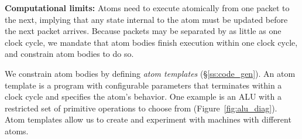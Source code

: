\textbf{Computational limits:} Atoms need to execute atomically from one packet
to the next, implying that any state internal to the atom must be updated
before the next packet arrives.  Because packets may be separated by as little
as one clock cycle, we mandate that atom bodies finish execution within one
clock cycle, and constrain atom bodies to do so.

We constrain atom bodies by defining {\it atom templates}
(\S\ref{ss:code_gen}).  An atom template is a program with configurable
parameters that terminates within a clock cycle and specifies the atom's
behavior.  One example is an ALU with a restricted set of primitive operations
to choose from (Figure~\ref{fig:alu_diag}). Atom templates allow us to create
and experiment with \absmachine machines with different atoms.


